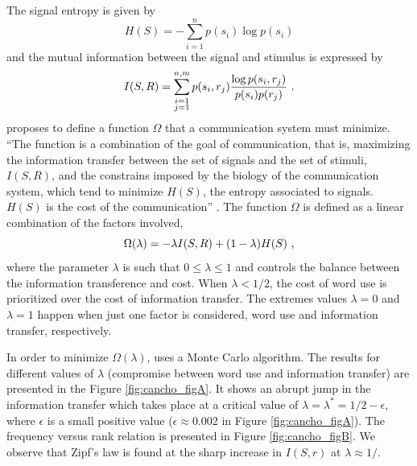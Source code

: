 The signal entropy is given by
\begin{equation}
H(S) = - \sum_{i=1}^{n} p(s_i) \log p(s_i)
\end{equation}
and the mutual information between the signal and stimulus is expressed by
\begin{equation}
I(S,R) = \sum_{\substack{i=1\\ j=1}}^{n,m} p(s_i, r_j) \frac{\log p(s_i, r_j)}{p(s_i) p(r_j)} \textmd{ .}
\end{equation}
\cite{cancho2005} proposes to define a function $\Omega$ that a communication system must
minimize. ``The function is a combination of the goal of communication, that is, maximizing the 
information transfer between the set of signals and the set of stimuli, $I(S, R)$, and the constrains 
imposed by the biology of the communication system, which tend to minimize $H(S)$, the entropy associated 
to signals. $H(S)$ is the cost of the communication'' \citep{cancho2005}. The function $\Omega$ is
defined as a linear combination of the factors involved,
\begin{equation}
\Omega(\lambda) = - \lambda I(S,R) + (1-\lambda) H(S) \textmd{ ,}
\end{equation}
where the parameter $\lambda$ is such that $0 \leq \lambda \leq 1$ and controls the balance between 
the information transference and cost. When $\lambda < 1/2$, the cost of word use is prioritized over
the cost of information transfer. The extremes values $\lambda = 0$ and $\lambda = 1$ happen when just 
one factor is considered, word use and information transfer, respectively.

In order to minimize $\Omega(\lambda)$, \cite{cancho2005} uses a Monte Carlo algorithm.
The results for different values of $\lambda$ (compromise between word use and information transfer) 
are presented in the Figure \ref{fig:cancho_figA}. It shows an abrupt jump in the information transfer
which takes place at a critical value of $\lambda = \lambda^\ast = 1/2 - \epsilon$, where $\epsilon$
is a small positive value ($\epsilon \approx 0.002$ in Figure \ref{fig:cancho_figA}). The frequency versus rank
relation is presented in Figure \ref{fig:cancho_figB}. We observe that Zipf's law is found at the sharp increase in
$I(S,r)$ at $\lambda \approx 1/$.


